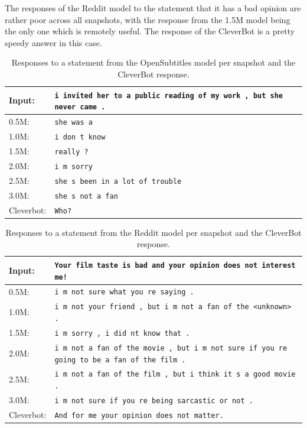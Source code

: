 The responses of the Reddit model to the statement that it has a bad opinion are rather poor across all snapshots, with the response from the 1.5M model being the only one which is remotely useful. The response of the CleverBot is a pretty speedy answer in this case.
\\
\begin{table}[H]
	\centering
	\begin{adjustbox}{max width=\textwidth}
		\begin{tabularx}{\textwidth}{lX}
			\toprule
			Input: 	& \texttt{i invited her to a public reading of my work , but she never came .}\\
			\midrule
			0.5M: 	& \texttt{she was a}\\
			1.0M: 	& \texttt{i don t know}\\
			1.5M:	& \texttt{really ?}\\
			2.0M:	& \texttt{i m sorry}\\
			2.5M:	& \texttt{she s been in a lot of trouble}\\
			3.0M:	& \texttt{she s not a fan}\\
			Cleverbot:	& \texttt{Who?}\\
			\bottomrule
		\end{tabularx}
	\end{adjustbox}
	\caption{Responses to a statement from the OpenSubtitles model per snapshot and the CleverBot response.}
	\label{results:example6_output:OpenSubtitle_compared}
\end{table}
\begin{table}[H]
	\centering
	\begin{adjustbox}{max width=\textwidth}
		\begin{tabularx}{\textwidth}{lX}
			\toprule
			Input: 	& \texttt{Your film taste is bad and your opinion does not interest me!}\\
			\midrule
			0.5M: 	& \texttt{i m not sure what you re saying .}\\
			1.0M: 	& \texttt{i m not your friend , but i m not a fan of the <unknown> .}\\
			1.5M:	& \texttt{i m sorry , i did nt know that .}\\
			2.0M:	& \texttt{i m not a fan of the movie , but i m not sure if you re going to be a fan of the film .}\\
			2.5M:	& \texttt{i m not a fan of the film , but i think it s a good movie .}\\
			3.0M:	& \texttt{i m not sure if you re being sarcastic or not .}\\
			Cleverbot:	& \texttt{And for me your opinion does not matter.}\\
			\bottomrule
		\end{tabularx}
	\end{adjustbox}
	\caption{Responses to a statement from the Reddit model per snapshot and the CleverBot response.}
	\label{results:example6_output:Reddit_compared}
\end{table}

